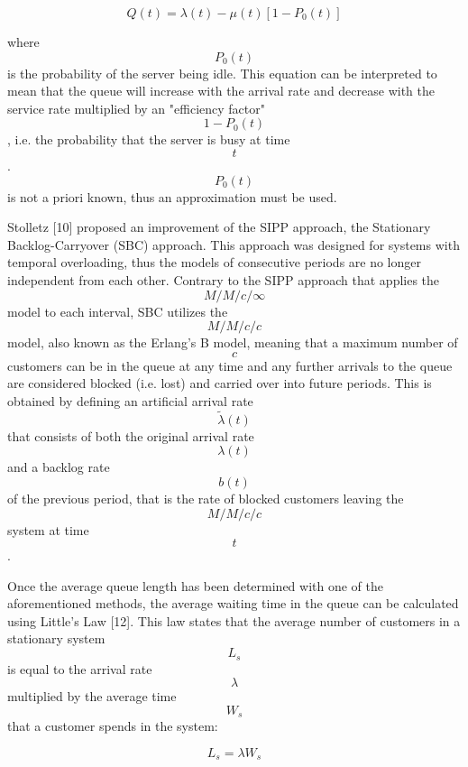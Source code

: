 $$ Q(t) = \lambda(t) - \mu(t) [1 - P_0(t)] $$

where $$ P_0(t) $$ is the probability of the server being idle. This equation can be interpreted to mean that the queue will increase with the arrival rate and decrease with the service rate multiplied by an "efficiency factor" $$ 1 - P_0(t) $$, i.e. the probability that the server is busy at time $$ t $$. $$ P_0(t) $$ is not a priori known, thus an approximation must be used.

Stolletz [10] proposed an improvement of the SIPP approach, the Stationary Backlog-Carryover (SBC) approach. This approach was designed for systems with temporal overloading, thus the models of consecutive periods are no longer independent from each other. Contrary to the SIPP approach that applies the $$ M/M/c/\infty $$ model to each interval, SBC utilizes the $$ M/M/c/c $$ model, also known as the Erlang’s B model, meaning that a maximum number of  $$ c $$ customers can be in the queue at any time and any further arrivals to the queue are considered blocked (i.e. lost) and carried over into future periods. This is obtained by defining an artificial arrival rate $$ \widetilde{\lambda}(t) $$ that consists of both the original arrival rate $$ \lambda(t) $$ and a backlog rate $$ b(t) $$ of the previous period, that is the rate of blocked customers leaving the $$ M/M/c/c $$system at time $$ t $$.

Once the average queue length has been determined with one of the aforementioned methods, the average waiting time in the queue can be calculated using Little’s Law [12]. This law states that the average number of customers in a stationary system $$ L_s $$ is equal to the arrival rate $$ \lambda $$ multiplied by the average time $$ W_s $$ that a customer spends in the system:

$$ L_s = \lambda W_s $$

\clearpage